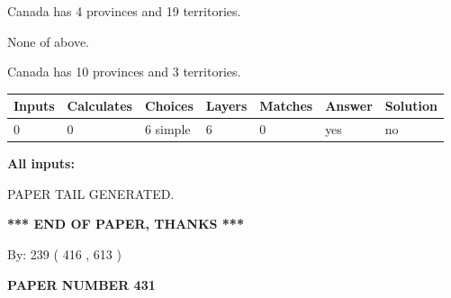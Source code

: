 \documentclass[12pt]{article}
\begin{document}
 
Canada has   4 provinces and  19 territories.
 
 
 None of above.
 
 
\noindent{}
 
 
Canada has 10  provinces and 3 territories.
 
 
\noindent{}
 
 
   
   
   
   
\noindent\begin{tabular}{|l|l|l|l|l|l|l|}
 \hline
Inputs & Calculates & Choices & Layers & Matches & Answer & Solution \\ \hline
 0  & 
 0  & 
 6
  simple  
  & 
 6  & 
 0  & 
  yes & 
  no 
  \\ \hline
 \end{tabular}
   
   
   
   
\noindent{}
   
   
   
   
\noindent\vspace{0.1in}\hspace{-0.08in} {\textbf{\Large{All inputs: }}}
   
   
   
   
   
   
 \vspace{0.2in}
 
   
   
\vspace{2.0in} PAPER TAIL GENERATED.
   
   
   
   
\vspace{1.0in} 
{\textbf{\large{ *** END OF PAPER, THANKS *** }}} 
   
   
\hspace{1.0in} By: 
 239 ( 416 ,  613 )
   
   
   
   
\newpage 
\setcounter{page}{ 
   431001 } 
   
   
   
   
 {\textbf{ \Large{ PAPER NUMBER  431  }}}
   
\end{document}
